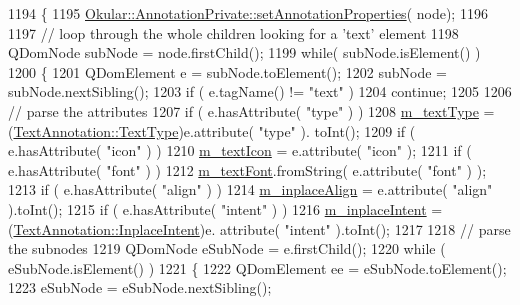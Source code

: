 \begin{DoxyCode}
1194 \{
1195     \hyperlink{classOkular_1_1AnnotationPrivate_a5fc7b450fa8c7e2717372e7394c3aa39}{Okular::AnnotationPrivate::setAnnotationProperties}(
      node);
1196 
1197     \textcolor{comment}{// loop through the whole children looking for a 'text' element}
1198     QDomNode subNode = node.firstChild();
1199     \textcolor{keywordflow}{while}( subNode.isElement() )
1200     \{
1201         QDomElement e = subNode.toElement();
1202         subNode = subNode.nextSibling();
1203         \textcolor{keywordflow}{if} ( e.tagName() != \textcolor{stringliteral}{"text"} )
1204             \textcolor{keywordflow}{continue};
1205 
1206         \textcolor{comment}{// parse the attributes}
1207         \textcolor{keywordflow}{if} ( e.hasAttribute( \textcolor{stringliteral}{"type"} ) )
1208             \hyperlink{classOkular_1_1TextAnnotationPrivate_a585ca2578e082542e18b445ea37cb3af}{m\_textType} = (\hyperlink{classOkular_1_1TextAnnotation_af560204454bf812797bc95bea730b06e}{TextAnnotation::TextType})e.attribute( \textcolor{stringliteral}{"type"} ).
      toInt();
1209         \textcolor{keywordflow}{if} ( e.hasAttribute( \textcolor{stringliteral}{"icon"} ) )
1210             \hyperlink{classOkular_1_1TextAnnotationPrivate_a1df47fe4d3a7175b5536650d3d23b0f2}{m\_textIcon} = e.attribute( \textcolor{stringliteral}{"icon"} );
1211         \textcolor{keywordflow}{if} ( e.hasAttribute( \textcolor{stringliteral}{"font"} ) )
1212             \hyperlink{classOkular_1_1TextAnnotationPrivate_a2b22283c721246cd6fb8438a2325d4a4}{m\_textFont}.fromString( e.attribute( \textcolor{stringliteral}{"font"} ) );
1213         \textcolor{keywordflow}{if} ( e.hasAttribute( \textcolor{stringliteral}{"align"} ) )
1214             \hyperlink{classOkular_1_1TextAnnotationPrivate_ab61fd57ec0bf98230cabd0d508cec3d4}{m\_inplaceAlign} = e.attribute( \textcolor{stringliteral}{"align"} ).toInt();
1215         \textcolor{keywordflow}{if} ( e.hasAttribute( \textcolor{stringliteral}{"intent"} ) )
1216             \hyperlink{classOkular_1_1TextAnnotationPrivate_abf5061c7495736518eb3ded69034b9f4}{m\_inplaceIntent} = (\hyperlink{classOkular_1_1TextAnnotation_a6494ecc81861c6b3da81aa98a3cd16c5}{TextAnnotation::InplaceIntent})e.
      attribute( \textcolor{stringliteral}{"intent"} ).toInt();
1217 
1218         \textcolor{comment}{// parse the subnodes}
1219         QDomNode eSubNode = e.firstChild();
1220         \textcolor{keywordflow}{while} ( eSubNode.isElement() )
1221         \{
1222             QDomElement ee = eSubNode.toElement();
1223             eSubNode = eSubNode.nextSibling();

\end{DoxyCode}
